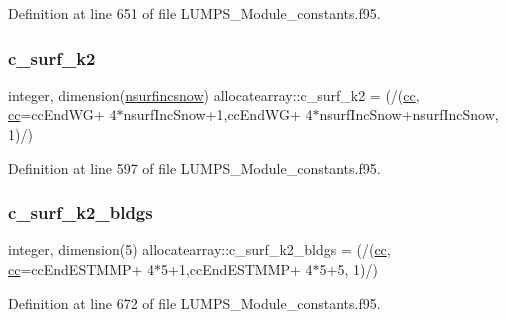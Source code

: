 Definition at line 651 of file L\+U\+M\+P\+S\+\_\+\+Module\+\_\+constants.\+f95.

\mbox{\label{namespaceallocatearray_ac896b61bac1cd4d2eea1332e3c5b18e6}} 
\subsubsection{\texorpdfstring{c\+\_\+surf\+\_\+k2}{c\_surf\_k2}}
{\footnotesize\ttfamily integer, dimension(\hyperlink{namespaceallocatearray_af4d113f332b6759cfa22271140c9162d}{nsurfincsnow}) allocatearray\+::c\+\_\+surf\+\_\+k2 = (/(\hyperlink{namespaceallocatearray_ac863c81704eb507dee10f5e10741e10c}{cc}, \hyperlink{namespaceallocatearray_ac863c81704eb507dee10f5e10741e10c}{cc}=cc\+End\+WG+ 4$\ast$nsurf\+Inc\+Snow+1,cc\+End\+WG+ 4$\ast$nsurf\+Inc\+Snow+nsurf\+Inc\+Snow, 1)/)}



Definition at line 597 of file L\+U\+M\+P\+S\+\_\+\+Module\+\_\+constants.\+f95.

\mbox{\label{namespaceallocatearray_a68884558810ea3ed48c5955a3fa9424f}} 
\subsubsection{\texorpdfstring{c\+\_\+surf\+\_\+k2\+\_\+bldgs}{c\_surf\_k2\_bldgs}}
{\footnotesize\ttfamily integer, dimension(5) allocatearray\+::c\+\_\+surf\+\_\+k2\+\_\+bldgs = (/(\hyperlink{namespaceallocatearray_ac863c81704eb507dee10f5e10741e10c}{cc}, \hyperlink{namespaceallocatearray_ac863c81704eb507dee10f5e10741e10c}{cc}=cc\+End\+E\+S\+T\+M\+MP+ 4$\ast$5+1,cc\+End\+E\+S\+T\+M\+MP+ 4$\ast$5+5, 1)/)}



Definition at line 672 of file L\+U\+M\+P\+S\+\_\+\+Module\+\_\+constants.\+f95.

\mbox{\label{namespaceallocatearray_af9655c312046a7961c47c6ef2b8903b5}} 
